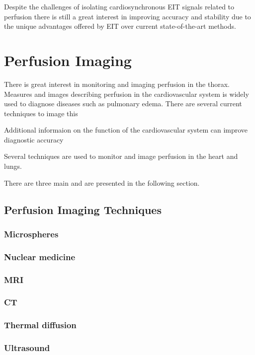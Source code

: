 Despite the challenges of isolating cardiosynchronous EIT signals related to 
perfusion there is still a great interest in 
improving accuracy and stability due to the unique 
advantages offered by EIT over current state-of-the-art methods.

\section{Perfusion Imaging}


There is great interest in monitoring and imaging perfusion in the thorax.
Measures and images describing perfusion in the cardiovascular 
system is widely used to diagnose diseases such as pulmonary edema. 
There are several current techniques to image this


Additional informaion on the function of the cardiovascular system can
improve diagnostic accuracy 

Several techniques are used to monitor and image perfusion in the heart 
and lungs.

There are three main  
and are presented in the following section. 

\subsection{Perfusion Imaging Techniques}
\subsubsection{Microspheres}
\subsubsection{Nuclear medicine}
\subsubsection{MRI}
\subsubsection{CT}
\subsubsection{Thermal diffusion}
\subsubsection{Ultrasound}
